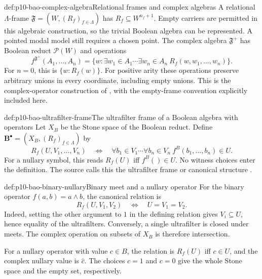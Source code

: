 \begin{hbdefinition}{def:p10-bao-complex-algebra}{Relational frames and complex algebras}
A relational \(\Lambda\)-frame
\(\mathfrak F=(W,(R_f)_{f\in\Lambda})\) has
\(R_f\subseteq W^{n_f+1}\).
Empty carriers are permitted in this algebraic construction, so
the trivial Boolean algebra can be represented. A pointed modal
model still requires a chosen point.
The complex algebra \(\mathfrak F^+\) has Boolean reduct
\(\mathcal P(W)\) and operations
\[
 f^{\mathfrak F^+}(A_1,\ldots,A_n)
 =\{w:\exists w_1\in A_1\cdots\exists w_n\in A_n\
                     R_f(w,w_1,\ldots,w_n)\}.
\]
For \(n=0\), this is \(\{w:R_f(w)\}\).
For positive arity these operations preserve arbitrary unions
in every coordinate, including empty unions.
This is the complex-operator construction of
\cite[preprint Definition~3.5, p.~8]{Venema2005Preprint},
with the empty-frame convention explicitly included here.
\end{hbdefinition}

\begin{hbdefinition}{def:p10-bao-ultrafilter-frame}{The ultrafilter frame of a Boolean algebra with operators}
Let \(X_B\) be the Stone space of the Boolean reduct.
Define \(\mathbf B^\bullet=(X_B,(R_f)_{f\in\Lambda})\) by
\[
 R_f(U,V_1,\ldots,V_n)
 \quad\Longleftrightarrow\quad
 \forall b_1\in V_1\cdots\forall b_n\in V_n\
                      f^B(b_1,\ldots,b_n)\in U.
\]
For a nullary symbol, this reads \(R_f(U)\) iff \(f^B()\in U\).
No witness choices enter the definition.
The source calls this the ultrafilter frame or canonical structure
\cite[preprint Definition~5.12, p.~19]{Venema2005Preprint}.
\end{hbdefinition}

\begin{hbexample}{def:p10-bao-binary-nullary}{Binary meet and a nullary operator}
For the binary operator \(f(a,b)=a\wedge b\), the canonical relation is
\[
 R_f(U,V_1,V_2)\quad\Longleftrightarrow\quad U=V_1=V_2.
\]
Indeed, setting the other argument to \(1\) in the defining relation
gives \(V_i\subseteq U\), hence equality of the ultrafilters.
Conversely, a single ultrafilter is closed under meets.
The complex operation on subsets of \(X_B\) is therefore intersection.

For a nullary operator with value \(c\in B\), the relation is
\(R_f(U)\) iff \(c\in U\), and the complex nullary value is
\(\widehat c\).
The choices \(c=1\) and \(c=0\) give the whole Stone space and the
empty set, respectively.
\end{hbexample}

